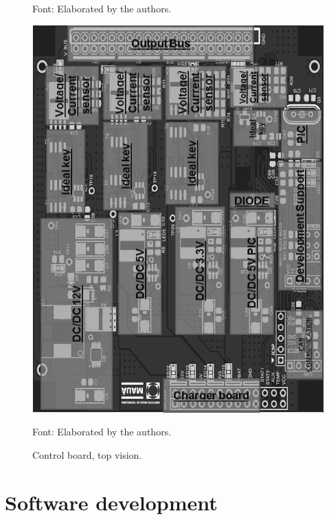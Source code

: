 \documentclass[3p]{elsarticle}
\begin{document}
\begin{figure}[th]
\begin{minipage}[b]{0.3\textwidth}
	    \begin{footnotesize}
		Font: Elaborated by the authors.
		\end{footnotesize}
	  \end{minipage}
	  \hfill
	  \begin{minipage}[b]{0.3\textwidth}
		\label{charger}
		\centering
		\includegraphics[width=1\linewidth]{./figs/control}
	    \caption{Control board, top vision.}
	    
	    \begin{footnotesize}
		Font: Elaborated by the authors.
		\end{footnotesize}
	  \end{minipage}
	\end{figure}
	
\section{Software development}
\label{Software development}
\end{document}
